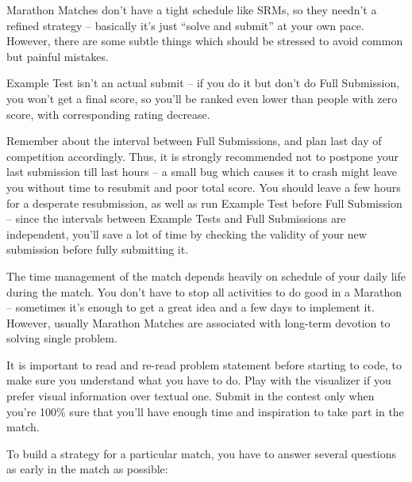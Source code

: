 Marathon Matches don't have a tight schedule like SRMs, so they needn't
a refined strategy -- basically it's just ``solve and submit'' at your
own pace. However, there are some subtle things which should be stressed
to avoid common but painful mistakes.

Example Test isn't an actual submit -- if you do it but don't do Full
Submission, you won't get a final score, so you'll be ranked even lower
than people with zero score, with corresponding rating decrease.

Remember about the interval between Full Submissions, and plan last day
of competition accordingly. Thus, it is strongly recommended not to
postpone your last submission till last hours -- a small bug which
causes it to crash might leave you without time to resubmit and poor
total score. You should leave a few hours for a desperate resubmission,
as well as run Example Test before Full Submission -- since the
intervals between Example Tests and Full Submissions are independent,
you'll save a lot of time by checking the validity of your new
submission before fully submitting it.

The time management of the match depends heavily on schedule of your
daily life during the match. You don't have to stop all activities to do
good in a Marathon -- sometimes it's enough to get a great idea and a
few days to implement it. However, usually Marathon Matches are
associated with long-term devotion to solving single problem.

It is important to read and re-read problem statement before starting to
code, to make sure you understand what you have to do. Play with the
visualizer if you prefer visual information over textual one. Submit in
the contest only when you're 100\% sure that you'll have enough time and
inspiration to take part in the match.

To build a strategy for a particular match, you have to answer several
questions as early in the match as possible:

